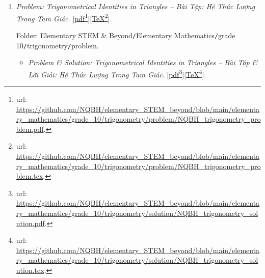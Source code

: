 \documentclass[12pt,oneside]{book}
\begin{document}
\begin{enumerate}
	Folder: {\sf Elementary STEM \& Beyond{\tt/}Elementary Mathematics{\tt/}grade 10{\tt/}function graph{\tt/}problem}.
	\begin{itemize}
		\item {\it Problem \& Solution: Function \& Graph  -- Bài Tập \& Lời Giải: Hàm Số \& Đồ Thị}. [\href{https://github.com/NQBH/elementary_STEM_beyond/blob/main/elementary_mathematics/grade_10/function_graph/solution/NQBH_function_graph_solution.pdf}{pdf}\footnote{{\sc url}: \url{https://github.com/NQBH/elementary_STEM_beyond/blob/main/elementary_mathematics/grade_10/function_graph/solution/NQBH_function_graph_solution.pdf}.}][\href{https://github.com/NQBH/elementary_STEM_beyond/blob/main/elementary_mathematics/grade_10/function_graph/solution/NQBH_function_graph_solution.tex}{\TeX}\footnote{{\sc url}: \url{https://github.com/NQBH/elementary_STEM_beyond/blob/main/elementary_mathematics/grade_10/function_graph/solution/NQBH_function_graph_solution.tex}.}].
		
		Folder: {\sf Elementary STEM \& Beyond{\tt/}Elementary Mathematics{\tt/}grade 10{\tt/}function graph{\tt/}solution}.
	\end{itemize}
	\item {\it Problem: Trigonometrical Identities in Triangles -- Bài Tập: Hệ Thức Lượng Trong Tam Giác}. [\href{https://github.com/NQBH/elementary_STEM_beyond/blob/main/elementary_mathematics/grade_10/trigonometry/problem/NQBH_trigonometry_problem.pdf}{pdf}\footnote{{\sc url}: \url{https://github.com/NQBH/elementary_STEM_beyond/blob/main/elementary_mathematics/grade_10/trigonometry/problem/NQBH_trigonometry_problem.pdf}.}][\href{https://github.com/NQBH/elementary_STEM_beyond/blob/main/elementary_mathematics/grade_10/trigonometry/problem/NQBH_trigonometry_problem.tex}{\TeX}\footnote{{\sc url}: \url{https://github.com/NQBH/elementary_STEM_beyond/blob/main/elementary_mathematics/grade_10/trigonometry/problem/NQBH_trigonometry_problem.tex}.}].
	
	Folder: {\sf Elementary STEM \& Beyond{\tt/}Elementary Mathematics{\tt/}grade 10{\tt/}trigonometry{\tt/}problem}.
	\begin{itemize}
		\item {\it Problem \& Solution: Trigonometrical Identities in Triangles -- Bài Tập \& Lời Giải: Hệ Thức Lượng Trong Tam Giác}. [\href{https://github.com/NQBH/elementary_STEM_beyond/blob/main/elementary_mathematics/grade_10/trigonometry/solution/NQBH_trigonometry_solution.pdf}{pdf}\footnote{{\sc url}: \url{https://github.com/NQBH/elementary_STEM_beyond/blob/main/elementary_mathematics/grade_10/trigonometry/solution/NQBH_trigonometry_solution.pdf}.}][\href{https://github.com/NQBH/elementary_STEM_beyond/blob/main/elementary_mathematics/grade_10/trigonometry/solution/NQBH_trigonometry_solution.tex}{\TeX}\footnote{{\sc url}: \url{https://github.com/NQBH/elementary_STEM_beyond/blob/main/elementary_mathematics/grade_10/trigonometry/solution/NQBH_trigonometry_solution.tex}.}].
		

\end{itemize}
\end{enumerate}
\end{document}
